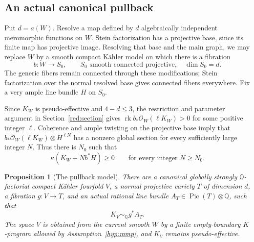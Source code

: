 \documentclass[11pt,letterpaper]{article}
\newtheorem{proposition}[theorem]{Proposition}
\theoremstyle{definition}
\theoremstyle{remark}
\begin{document}
\subsection{An actual canonical pullback}

Put \(d=a(W)\). Resolve a map defined by \(d\) algebraically independent
meromorphic functions on \(W\). Stein factorization has a projective
base, since its finite map has projective image. Resolving that base
and the main graph, we may replace \(W\) by a smooth compact Kähler
model on which there is a fibration
\[
 b:W\longrightarrow S_0,
 \qquad S_0\text{ smooth connected projective},\quad\dim S_0=d.
\]
The generic fibers remain connected through these modifications; Stein
factorization over the normal resolved base gives connected fibers
everywhere. Fix a very ample line bundle \(H\) on \(S_0\).

Since \(K_W\) is pseudo-effective and \(4-d\leq3\), the restriction
and parameter argument in Section~\ref{red:section} gives
\(\operatorname{rk} b_*\mathcal{O}_W(\ell K_W)>0\) for some positive integer \(\ell\).
Coherence and ample twisting on the projective base imply that
\(b_*\mathcal{O}_W(\ell K_W)\otimes H^{\ell N}\) has a nonzero global
section for every sufficiently large integer \(N\). Thus there is
\(N_0\) such that
\begin{equation}\label{pos:all-large-twists}
 \kappa(K_W+Nb^*H)\geq0
 \qquad\text{for every integer }N\geq N_0.
\end{equation}

\begin{proposition}[The pullback model]\label{pos:pullback-model}
There are a canonical globally strongly \(\mathbb{Q}\)-factorial compact
Kähler fourfold \(V\), a normal projective variety \(T\) of dimension
\(d\), a fibration \(g:V\to T\), and an actual rational line bundle
\(A_T\in\operatorname{Pic}(T)\otimes\mathbb{Q}\), such that
\begin{equation}\label{pos:canonical-pullback}
 K_V\sim_{\mathbb{Q}}g^*A_T.
\end{equation}
The space \(V\) is obtained from the current smooth \(W\) by a finite
empty-boundary \(K\)-program allowed by Assumption~\ref{hyp:mmp}, and
\(K_V\) remains pseudo-effective.
\end{proposition}
\end{document}
